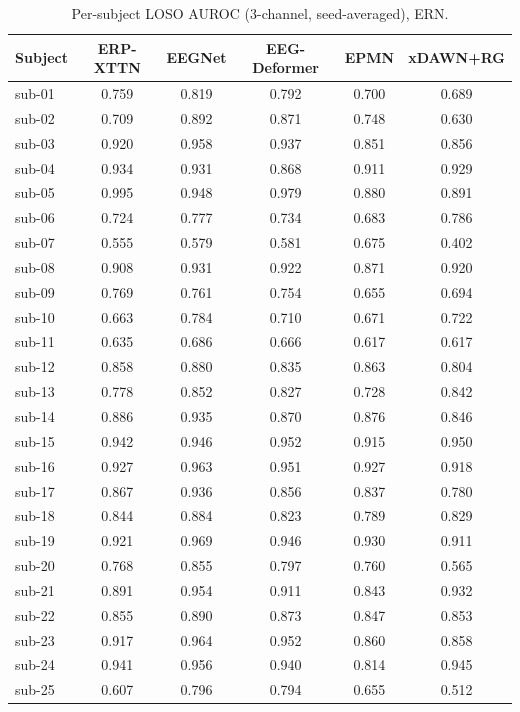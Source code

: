 \begin{table}[t]
\centering
\scriptsize
\caption{Per-subject LOSO AUROC (3-channel, seed-averaged), ERN.}
\label{tab:persubj-ern}
\begin{tabular}{lccccc}
\toprule
Subject & ERP-XTTN & EEGNet & EEG-Deformer & EPMN & xDAWN+RG \\
\midrule
sub-01 & 0.759 & 0.819 & 0.792 & 0.700 & 0.689 \\
sub-02 & 0.709 & 0.892 & 0.871 & 0.748 & 0.630 \\
sub-03 & 0.920 & 0.958 & 0.937 & 0.851 & 0.856 \\
sub-04 & 0.934 & 0.931 & 0.868 & 0.911 & 0.929 \\
sub-05 & 0.995 & 0.948 & 0.979 & 0.880 & 0.891 \\
sub-06 & 0.724 & 0.777 & 0.734 & 0.683 & 0.786 \\
sub-07 & 0.555 & 0.579 & 0.581 & 0.675 & 0.402 \\
sub-08 & 0.908 & 0.931 & 0.922 & 0.871 & 0.920 \\
sub-09 & 0.769 & 0.761 & 0.754 & 0.655 & 0.694 \\
sub-10 & 0.663 & 0.784 & 0.710 & 0.671 & 0.722 \\
sub-11 & 0.635 & 0.686 & 0.666 & 0.617 & 0.617 \\
sub-12 & 0.858 & 0.880 & 0.835 & 0.863 & 0.804 \\
sub-13 & 0.778 & 0.852 & 0.827 & 0.728 & 0.842 \\
sub-14 & 0.886 & 0.935 & 0.870 & 0.876 & 0.846 \\
sub-15 & 0.942 & 0.946 & 0.952 & 0.915 & 0.950 \\
sub-16 & 0.927 & 0.963 & 0.951 & 0.927 & 0.918 \\
sub-17 & 0.867 & 0.936 & 0.856 & 0.837 & 0.780 \\
sub-18 & 0.844 & 0.884 & 0.823 & 0.789 & 0.829 \\
sub-19 & 0.921 & 0.969 & 0.946 & 0.930 & 0.911 \\
sub-20 & 0.768 & 0.855 & 0.797 & 0.760 & 0.565 \\
sub-21 & 0.891 & 0.954 & 0.911 & 0.843 & 0.932 \\
sub-22 & 0.855 & 0.890 & 0.873 & 0.847 & 0.853 \\
sub-23 & 0.917 & 0.964 & 0.952 & 0.860 & 0.858 \\
sub-24 & 0.941 & 0.956 & 0.940 & 0.814 & 0.945 \\
sub-25 & 0.607 & 0.796 & 0.794 & 0.655 & 0.512 \\

\end{tabular}
\end{table}
